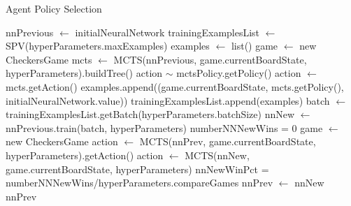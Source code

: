 \documentclass{article}
\begin{document}
    \begin{algorithm}
        \caption{Agent Policy Selection}\label{alg:cap}
        \begin{algorithmic}
        
        \State nnPrevious $\gets$ initialNeuralNetwork
            \State trainingExamplesList $\gets$ SPV(hyperParameters.maxExamples)
                \State examples $\gets$ list()
                \State game $\gets$ new CheckersGame
                    \State mcts $\gets$ MCTS(nnPrevious, game.currentBoardState, hyperParameters).buildTree()
                        \State action $\sim$ mctsPolicy.getPolicy() 
                    \Else
                        \State action $\gets$ mcts.getAction()
                    \EndIf
                    \State examples.append((game.currentBoardState, mcts.getPolicy(), initialNeuralNetwork.value))
                \EndWhile
                \State trainingExamplesList.append(examples)
                    \State batch $\gets$ trainingExamplesList.getBatch(hyperParameters.batchSize)
                    \State nnNew $\gets$ nnPrevious.train(batch, hyperParameters)
                \EndFor
                \State numberNNNewWins = 0
                    \State game $\gets$ new CheckersGame
                            \State action $\gets$ MCTS(nnPrev, game.currentBoardState, hyperParameters).getAction()
                            \State action $\gets$ MCTS(nnNew, game.currentBoardState, hyperParameters)
                        \EndIf
                    \EndWhile
                \EndFor
                \State nnNewWinPct = numberNNNewWins/hyperParameters.compareGames
                    \State nnPrev $\gets$ nnNew
                \EndIf
            \EndFor
        \EndFor
        \State \Return nnPrev
        \EndFunction
        \end{algorithmic}
    \end{algorithm}
\end{document}
